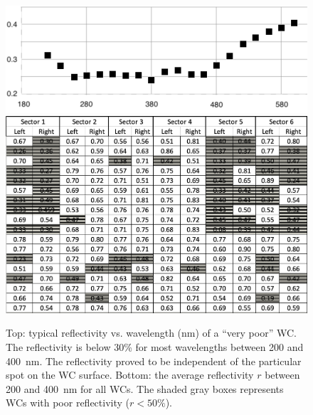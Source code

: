 \begin{figure}
	\centering
	\includegraphics[width=0.98\columnwidth,keepaspectratio]{img/winstoConeSample2Reflectivity.png}
	\includegraphics[width=0.98\columnwidth,keepaspectratio]{img/wcStatusBefore.png}
	\caption{Top: typical reflectivity vs. wavelength (nm) of a ``very poor'' WC. The reflectivity is below 30\% for most
          wavelengths between 200 and 400~nm. The reflectivity proved to be independent of the particular spot on the
          WC surface. Bottom: the average reflectivity $r$ between 200 and 400~nm for all WCs. The shaded gray
          boxes represents WCs with poor reflectivity ($r < 50\%$).}
	\label{fig:wcStatusBefore}
\end{figure}

